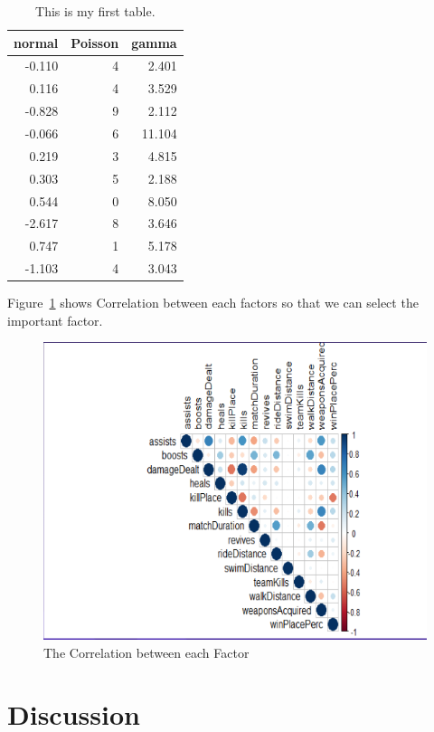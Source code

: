 \documentclass[12pt]{article}
\begin{document}
\begin{table}[tbp]
  \caption{This is my first table.}
  \label{tab:rv}
\centering
\begin{tabular}{rrr}
  \toprule
normal & Poisson & gamma \\ 
  \midrule
-0.110 & 4 & 2.401 \\ 
  0.116 & 4 & 3.529 \\ 
  -0.828 & 9 & 2.112 \\ 
  -0.066 & 6 & 11.104 \\ 
  0.219 & 3 & 4.815 \\ 
  0.303 & 5 & 2.188 \\ 
  0.544 & 0 & 8.050 \\ 
  -2.617 & 8 & 3.646 \\ 
  0.747 & 1 & 5.178 \\ 
  -1.103 & 4 & 3.043 \\ 
   \bottomrule
\end{tabular}
\end{table}

Figure~\ref{fig:Correlation} shows Correlation between each factors so that we can select the important factor. 



\begin{figure}[tbp]
	\centering
	\includegraphics[width=\textwidth]{Correlation.png}
	\caption{The Correlation between each Factor}
	\label{fig:Correlation}
\end{figure}


\section{Discussion}
\label{sec:disc}
\end{document}
